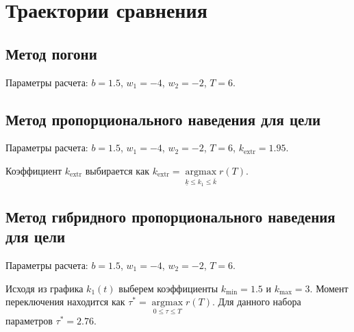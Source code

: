 \documentclass[a4paper,12pt, openany]{book}
\theoremstyle{plain} %
\theoremstyle{definition} %
\theoremstyle{remark} %
\numberwithin{equation}{chapter}
\begin{document}
{\section{Траектории сравнения}

\subsection{Метод погони}

Параметры расчета: $b=1.5$, $w_1 = -4$, $w_2 = -2$, $T=6$. 


\newpage

\subsection{Метод пропорционального наведения для цели}

Параметры расчета: $b=1.5$, $w_1 = -4$, $w_2 = -2$, $T=6$, $k_{\mathrm{extr}} = 1.95$.



Коэффициент $k_{\mathrm{extr}}$ выбирается как $k_{\mathrm{extr}}  = \mathop {\mathrm{argmax}}\limits_{\underline k  \leqslant k_1  \leqslant \bar k} {r\left( T \right)}$. 

\subsection{Метод гибридного пропорционального наведения для цели}

Параметры расчета: $b=1.5$, $w_1 = -4$, $w_2 = -2$, $T=6$. 


Исходя из графика $k_1(t)$ выберем коэффициенты $k_{\min} = 1.5$ и $k_{\max} = 3$. Момент переключения находится как $\tau ^*  = \mathop {\mathrm{argmax}}\limits_{0 \leqslant \tau  \leqslant T} r\left( T \right)$. Для данного набора параметров $\tau^* = 2.76$. 


\newpage



}
\end{document}
